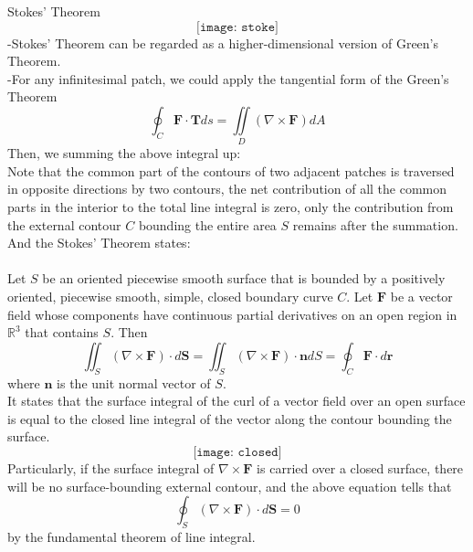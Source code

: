 \documentclass[10pt]{beamer}
\begin{document}
\begin{frame}[allowframebreaks]{Stokes' Theorem}
$$\texttt{[image: stoke]}$$
-Stokes' Theorem can be regarded as a higher-dimensional version of Green's Theorem.\\
-For any infinitesimal patch, we could apply the tangential form of the Green's Theorem
$$\oint_C\mathbf{F}\cdot \mathbf{T}ds = \iint\limits_D(\nabla\times\mathbf{F})dA$$
Then, we summing the above integral up:\\
Note that the common part of the contours of two adjacent patches is traversed in opposite directions by two contours, the net contribution of all the common parts in the interior to the total line integral is zero, only the contribution from the external contour $C$ bounding the entire area $S$ remains after the summation. And the Stokes' Theorem states:\\~\\
Let $S$ be an oriented piecewise smooth surface that is bounded by a positively
oriented, piecewise smooth, simple, closed boundary curve $C$. Let $\mathbf{F}$ be a vector field whose components have continuous partial derivatives on an open region in
$\mathbb{R}^3$ that contains $S$. Then
$$\iint_S(\nabla\times\mathbf{F})\cdot d\mathbf{S} = \iint_S(\nabla\times\mathbf{F})\cdot\mathbf{n}dS = \oint_C\mathbf{F}\cdot d\mathbf{r}$$
where $\mathbf{n}$ is the unit normal vector of $S$.\\
It states that {\color{red} the surface integral of the curl of a vector field over an open surface is equal to the closed line integral of the vector along the contour bounding the surface}.
$$\texttt{[image: closed]}$$
Particularly, if the surface integral of $\nabla\times\mathbf{F}$ is carried over a closed surface, there will be no surface-bounding external contour, and the above equation tells that $$\oint_S(\nabla\times\mathbf{F})\cdot d\mathbf{S} = 0$$
by the fundamental theorem of line integral.


\end{frame}
\end{document}
